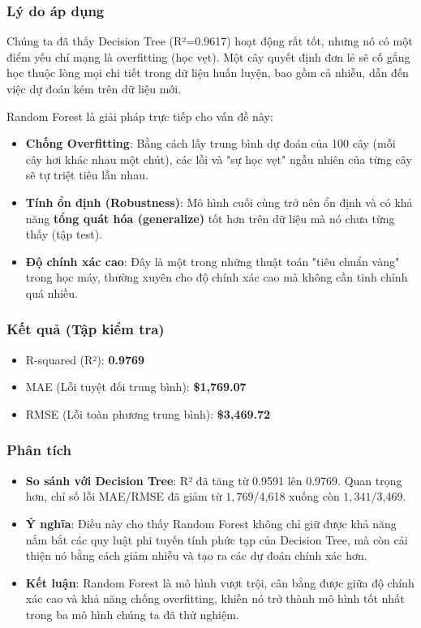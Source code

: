 \subsubsection{Lý do áp dụng}
Chúng ta đã thấy Decision Tree (R²=0.9617) hoạt động rất tốt, nhưng nó có một điểm yếu chí mạng là overfitting (học vẹt). Một cây quyết định đơn lẻ sẽ cố gắng học thuộc lòng mọi chi tiết trong dữ liệu huấn luyện, bao gồm cả nhiễu, dẫn đến việc dự đoán kém trên dữ liệu mới.

Random Forest là giải pháp trực tiếp cho vấn đề này:
\begin{itemize}
    \item \textbf{Chống Overfitting}: Bằng cách lấy trung bình dự đoán của 100 cây (mỗi cây hơi khác nhau một chút), các lỗi và "sự học vẹt" ngẫu nhiên của từng cây sẽ tự triệt tiêu lẫn nhau.

    \item \textbf{Tính ổn định (Robustness)}: Mô hình cuối cùng trở nên ổn định và có khả năng \textbf{tổng quát hóa (generalize)} tốt hơn trên dữ liệu mà nó chưa từng thấy (tập test).
    
    \item \textbf{Độ chính xác cao}: Đây là một trong những thuật toán "tiêu chuẩn vàng" trong học máy, thường xuyên cho độ chính xác cao mà không cần tinh chỉnh quá nhiều.
\end{itemize}

\subsubsection{Kết quả (Tập kiểm tra)}
\begin{itemize}
    \item R-squared (R²): \textbf{0.9769}
    \item MAE (Lỗi tuyệt đối trung bình): \textbf{\$1,769.07}
    \item RMSE (Lỗi toàn phương trung bình): \textbf{\$3,469.72}
\end{itemize}

\subsubsection{Phân tích}
\begin{itemize}
    \item \textbf{So sánh với Decision Tree}: R² đã tăng từ 0.9591 lên 0.9769. Quan trọng hơn, chỉ số lỗi MAE/RMSE đã giảm từ $1,769 / $4,618 xuống còn $1,341 / $3,469.

    \item \textbf{Ý nghĩa}: Điều này cho thấy Random Forest không chỉ giữ được khả năng nắm bắt các quy luật phi tuyến tính phức tạp của Decision Tree, mà còn cải thiện nó bằng cách giảm nhiễu và tạo ra các dự đoán chính xác hơn.
    
    \item \textbf{Kết luận}: Random Forest là mô hình vượt trội, cân bằng được giữa độ chính xác cao và khả năng chống overfitting, khiến nó trở thành mô hình tốt nhất trong ba mô hình chúng ta đã thử nghiệm.
\end{itemize}

